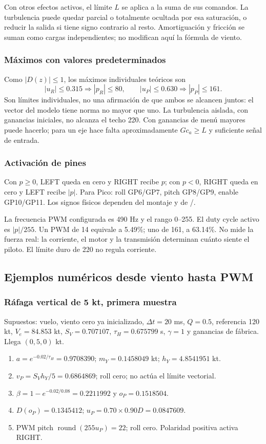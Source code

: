 \documentclass[11pt,a4paper]{article}
\newcommand{\code}[1]{\texttt{\detokenize{#1}}}
\begin{document}
Con otros efectos activos, el límite $L$ se aplica a la suma de sus comandos. La turbulencia puede quedar parcial o totalmente ocultada por esa saturación, o reducir la salida si tiene signo contrario al resto. Amortiguación y fricción se suman como cargas independientes; no modifican aquí la fórmula de viento.

\subsubsection{Máximos con valores predeterminados}
Como $|D(z)|\le1$, los máximos individuales teóricos son
\begin{equation}
|u_R|\le0.315\Rightarrow |p_R|\le80,\qquad
|u_P|\le0.630\Rightarrow |p_P|\le161.
\end{equation}
Son límites individuales, no una afirmación de que ambos se alcancen juntos: el vector del modelo tiene norma no mayor que uno. La turbulencia aislada, con ganancias iniciales, no alcanza el techo 220. Con ganancias de menú mayores puede hacerlo; para un eje hace falta aproximadamente $G c_a\ge L$ y suficiente señal de entrada.

\subsubsection{Activación de pines}
Con $p\ge0$, LEFT queda en cero y RIGHT recibe $p$; con $p<0$, RIGHT queda en cero y LEFT recibe $|p|$. Para Pico: roll GP6/GP7, pitch GP8/GP9, enable GP10/GP11. Los signos físicos dependen del montaje y de \code{ROLL_MOTOR_DIRECTION}/\code{PITCH_MOTOR_DIRECTION}.

La frecuencia PWM configurada es 490 Hz y el rango 0--255. El duty cycle activo es $|p|/255$. Un PWM de 14 equivale a 5.49\%; uno de 161, a 63.14\%. No mide la fuerza real: la corriente, el motor y la transmisión determinan cuánto siente el piloto. El límite duro de 220 no regula corriente.

\subsection{Ejemplos numéricos desde viento hasta PWM}
\subsubsection{Ráfaga vertical de 5 kt, primera muestra}
Supuestos: vuelo, viento cero ya inicializado, $\Delta t=20$ ms, $Q=0.5$, referencia 120 kt, $V_e=84.853$ kt, $S_V=0.707107$, $\tau_H=0.675799$ s, $\gamma=1$ y ganancias de fábrica. Llega $(0,5,0)$ kt.
\begin{enumerate}
\item $a=e^{-0.02/\tau_H}=0.9708390$; $m_Y=0.1458049$ kt; $h_Y=4.8541951$ kt.
\item $v_P=S_V h_Y/5=0.6864869$; roll cero; no actúa el límite vectorial.
\item $\beta=1-e^{-0.02/0.08}=0.2211992$ y $o_P=0.1518504$.
\item $D(o_P)=0.1345412$; $u_P=0.70\times0.90D=0.0847609$.
\item PWM pitch $\operatorname{round}(255u_P)=22$; roll cero. Polaridad positiva activa RIGHT.
\end{enumerate}
\end{document}
